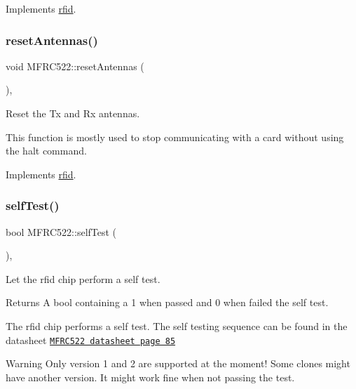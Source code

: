 Implements \mbox{\hyperlink{classrfid_a9790d273f2385c8fb48bb85ca2aa0d10}{rfid}}.

\mbox{\label{class_m_f_r_c522_ac981022cc3ae79f727b2365e309cf691}} 
\subsubsection{\texorpdfstring{reset\+Antennas()}{resetAntennas()}}
{\footnotesize\ttfamily void M\+F\+R\+C522\+::reset\+Antennas (\begin{DoxyParamCaption}{ }\end{DoxyParamCaption})\hspace{0.3cm}{\ttfamily [override]}, {\ttfamily [virtual]}}



Reset the Tx and Rx antennas. 

This function is mostly used to stop communicating with a card without using the halt command. 

Implements \mbox{\hyperlink{classrfid_abf4826e77ab7b02f04c8f01d969149c1}{rfid}}.

\mbox{\label{class_m_f_r_c522_adcc4f5eb212c1a94e462eab459bd685e}} 
\subsubsection{\texorpdfstring{self\+Test()}{selfTest()}}
{\footnotesize\ttfamily bool M\+F\+R\+C522\+::self\+Test (\begin{DoxyParamCaption}{ }\end{DoxyParamCaption})\hspace{0.3cm}{\ttfamily [override]}, {\ttfamily [virtual]}}



Let the rfid chip perform a self test. 

\begin{DoxyReturn}{Returns}
A bool containing a 1 when passed and 0 when failed the self test.
\end{DoxyReturn}
The rfid chip performs a self test. The self testing sequence can be found in the datasheet \href{https://www.nxp.com/docs/en/data-sheet/MFRC522.pdf}{\tt M\+F\+R\+C522 datasheet page 85} \begin{DoxyWarning}{Warning}
Only version 1 and 2 are supported at the moment! Some clones might have another version. It might work fine when not passing the test. 
\end{DoxyWarning}


